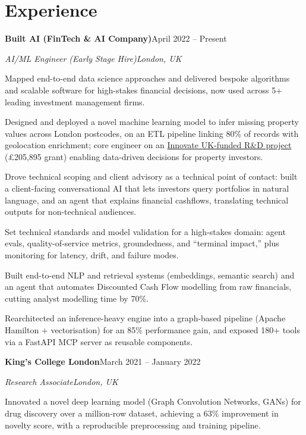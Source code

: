 \documentclass[10pt,a4paper]{article}
\newcommand{\entry}[4]{%
  {\color{company}\bfseries #1}\hfill {\color{muted}#2}\par
  \vspace{1pt}
  {\itshape #3}\hfill {\color{muted}\itshape #4}\par
  \vspace{3pt}%
}
\begin{document}
\section{Experience}
\entry{Built AI (FinTech \& AI Company)}{April 2022 -- Present}{AI/ML Engineer (Early Stage Hire)}{London, UK}
\begin{tight}
  \item Mapped end-to-end data science approaches and delivered bespoke algorithms and scalable software for high-stakes financial decisions, now used across 5+ leading investment management firms.
  \item Designed and deployed a novel machine learning model to infer missing property values across London postcodes, on an ETL pipeline linking 80\% of records with geolocation enrichment; core engineer on an \href{https://gtr.ukri.org/projects?ref=10022996}{Innovate UK-funded R\&D project} (\pounds205,895 grant) enabling data-driven decisions for property investors.
  \item Drove technical scoping and client advisory as a technical point of contact: built a client-facing conversational AI that lets investors query portfolios in natural language, and an agent that explains financial cashflows, translating technical outputs for non-technical audiences.
  \item Set technical standards and model validation for a high-stakes domain: agent evals, quality-of-service metrics, groundedness, and ``terminal impact,'' plus monitoring for latency, drift, and failure modes.
  \item Built end-to-end NLP and retrieval systems (embeddings, semantic search) and an agent that automates Discounted Cash Flow modelling from raw financials, cutting analyst modelling time by 70\%.
  \item Rearchitected an inference-heavy engine into a graph-based pipeline (Apache Hamilton + vectorisation) for an 85\% performance gain, and exposed 180+ tools via a FastAPI MCP server as reusable components.
\end{tight}

\entry{King's College London}{March 2021 -- January 2022}{Research Associate}{London, UK}
\begin{tight}
  \item Innovated a novel deep learning model (Graph Convolution Networks, GANs) for drug discovery over a million-row dataset, achieving a 63\% improvement in novelty score, with a reproducible preprocessing and training pipeline.
\end{tight}
\end{document}
